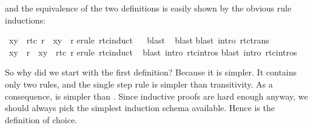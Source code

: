 \begin{isabellebody}
%
\begin{isamarkuptext}%
\noindent
and the equivalence of the two definitions is easily shown by the obvious rule
inductions:%
\end{isamarkuptext}%
\isamarkuptrue%
\ {\isachardoublequote}{\isacharparenleft}x{\isacharcomma}y{\isacharparenright}\ {\isasymin}\ rtc{}\ r\ {\isasymLongrightarrow}\ {\isacharparenleft}x{\isacharcomma}y{\isacharparenright}\ {\isasymin}\ r{\isacharasterisk}{\isachardoublequote}\isanewline
\isamarkupfalse%
erule\ rtc{}{\isachardot}induct{\isacharparenright}\isanewline
\ \ \isamarkupfalse%
blast{\isacharparenright}\isanewline
\ \isamarkupfalse%
blast{\isacharparenright}\isanewline
\isamarkupfalse%
blast\ intro{\isacharcolon}\ rtc{\isacharunderscore}trans{\isacharparenright}\isanewline
\isamarkupfalse%
\isanewline
\isanewline
\isamarkupfalse%
\ {\isachardoublequote}{\isacharparenleft}x{\isacharcomma}y{\isacharparenright}\ {\isasymin}\ r{\isacharasterisk}\ {\isasymLongrightarrow}\ {\isacharparenleft}x{\isacharcomma}y{\isacharparenright}\ {\isasymin}\ rtc{}\ r{\isachardoublequote}\isanewline
\isamarkupfalse%
erule\ rtc{\isachardot}induct{\isacharparenright}\isanewline
\ \isamarkupfalse%
blast\ intro{\isacharcolon}\ rtc{}{\isachardot}intros{\isacharparenright}\isanewline
\isamarkupfalse%
blast\ intro{\isacharcolon}\ rtc{}{\isachardot}intros{\isacharparenright}\isanewline
\isamarkupfalse%
\isamarkupfalse%
%
\begin{isamarkuptext}%
So why did we start with the first definition? Because it is simpler. It
contains only two rules, and the single step rule is simpler than
transitivity.  As a consequence,  is simpler than
. Since inductive proofs are hard enough
anyway, we should always pick the simplest induction schema available.
Hence  is the definition of choice.


\end{isamarkuptext}
\end{isabellebody}
